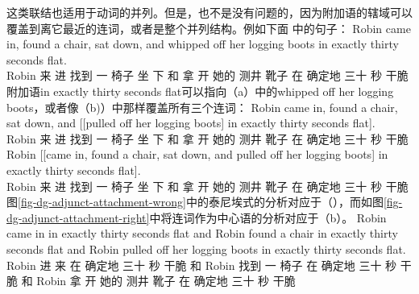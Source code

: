 这类联结也适用于动词的并列。但是，也不是没有问题的，因为附加语的辖域可以覆盖到离它最近的连词，或者是整个并列结构。例如下面 \citet[]{Levine2003a}中的句子：
\ea
\gll Robin came in, found a chair, sat down, and whipped off her logging boots in exactly thirty seconds flat.\\
Robin 来 进 找到 一 椅子 坐 下 和 拿 开 她的 测井 靴子 在 确定地 三十 秒 干脆\\
\z
附加语in exactly thirty seconds flat可以指向（a）中的whipped off her logging boots，或者像（b)）中那样覆盖所有三个连词：
\eal
\ex 
\gll Robin came in, found a chair, sat down, and [[pulled off her logging boots] in exactly thirty seconds flat].\\
     Robin 来   进   找到  一 椅子    坐  下    和  \hspaceThis{[[}拿 开 她的 测井 靴子 在 确定地 三十 秒 干脆\\
\ex\label{ex-Robin-flat-VP}
\gll Robin [[came in, found a chair, sat down, and pulled off her logging boots] in exactly thirty seconds flat].\\
     Robin \hspaceThis{[[}来 进 找到 一 椅子 坐 下 和 拿 开 她的 测井 靴子 在 确定地 三十 秒 干脆\\
\zl
图\vref{fig-dg-adjunct-attachment-wrong}中的泰尼埃式的分析对应于（），而如图\vref{fig-dg-adjunct-attachment-right}中将连词作为中心语的分析对应于（b）。
\ea
\gll Robin came in in exactly thirty seconds flat and Robin found a chair in exactly thirty seconds flat
and Robin pulled off her logging boots in exactly thirty seconds flat.\\
Robin 进 来 在 确定地 三十 秒 干脆 和 Robin 找到 一 椅子 在 确定地 三十 秒 干脆 和 Robin 拿 开 她的 测井 靴子 在 确定地 三十 秒 干脆\\
